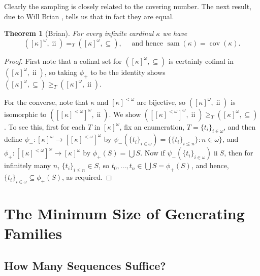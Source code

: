 \documentclass{article}
\newtheorem{thm}{Theorem}[section]
\newcommand{\tq}{\ge_T}
\newcommand{\te}{=_T}
\DeclareMathOperator{\ii}{ii}
\begin{document}
Clearly the sampling is closely related to the covering number. 
The next result, due to Will Brian \cite{Brian}, tells us that in fact they are equal.
\begin{thm}[Brian] \label{th:cov=sam} For every infinite cardinal $\kappa$ we have 
\[([\kappa]^\omega,\ii)\te([\kappa]^\omega,\subseteq), \quad \text{ and hence }\mathop{sam}(\kappa)=\mathop{cov}(\kappa).\]
\end{thm}
\begin{proof} First note that a cofinal set for $([\kappa]^\omega,\subseteq)$ is certainly cofinal in $( [\kappa]^{\omega},\ii)$, so taking $\phi_+$ to be the identity shows $([\kappa]^\omega,\subseteq) \tq ( [\kappa]^{\omega},\ii)$. 

For the converse,  note that $\kappa$ and $[\kappa]^{<\omega}$ are bijective, so $([\kappa]^\omega,\ii)$ is isomorphic to $([[\kappa]^{<\omega}]^\omega,\ii)$. We show $([[\kappa]^{<\omega}]^\omega,\ii)\tq([\kappa]^\omega,\subseteq)$. 
    To see this, first for each $T$ in $[\kappa]^\omega$, fix an enumeration, $T=\{t_i\}_{i\in \omega}$, 
    and then  define  $\psi_-:[\kappa]^\omega \to [[\kappa]^{<\omega}]^\omega$ 
    by $\psi_-(\{t_i\}_{i \in \omega})=\{ \{t_i\}_{i  \le n}\} : n \in \omega\}$, and $\phi_+:[[\kappa]^{<\omega}]^\omega \to [\kappa]^\omega$ by $\phi_+(S)=\bigcup S$. 
    Now if $\psi_-(\{t_i\}_{i \in \omega}) \ii S$, then for infinitely many $n$, $\{t_i\}_{i \le n} \in S$, so $t_0,\ldots,t_n \in \bigcup S=\phi_+(S)$, and hence, $\{t_i\}_{i \in \omega} \subseteq \phi_+(S)$, as required. 
\end{proof}
    






 












\section{The Minimum Size of Generating Families} 
\subsection{How Many Sequences Suffice?}\label{ssec:seqsam}
\end{document}
